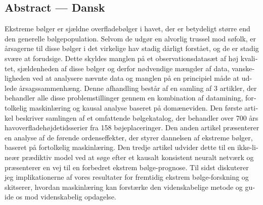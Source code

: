 \begin{otherlanguage}{danish}
\section*{Abstract --- Dansk}
Ekstreme bølger er sjældne overfladebølger i havet, der er betydeligt større end den generelle bølgepopulation. Selvom de udgør en alvorlig trussel mod søfolk, er årsagerne til disse bølger i det virkelige hav stadig dårligt forstået, og de er stadig svære at forudsige. Dette skyldes manglen på et observationsdatasæt af høj kvalitet, sjældenheden af disse bølger og derfor nødvendige mængder af data, vanskeligheden ved at analysere nævnte data og manglen på en principiel måde at udlede årsagssammenhæng. Denne afhandling består af en samling af 3 artikler, der behandler alle disse problemstillinger gennem en kombination af datamining, fortolkelig maskinlæring og kausal analyse baseret på domæneviden. Den første artikel beskriver samlingen af et omfattende bølgekatalog, der behandler over 700 års havoverfladehøjdetidsserier fra 158 bøjeplaceringer. Den anden artikel præsenterer en analyse af de førende ordenseffekter, der styrer dannelsen af ekstreme bølger, baseret på fortolkelig maskinlæring. Den tredje artikel udvider dette til en ikke-lineær prædiktiv model ved at søge efter et kausalt konsistent neuralt netværk og præsenterer en vej til en forbedret ekstrem bølge-prognose. Til sidst diskuterer jeg implikationerne af vores resultater for fremtidig ekstrem bølge-forskning og skitserer, hvordan maskinlæring kan forstærke den videnskabelige metode og guide os mod videnskabelig opdagelse.
\end{otherlanguage}

\clearpage
